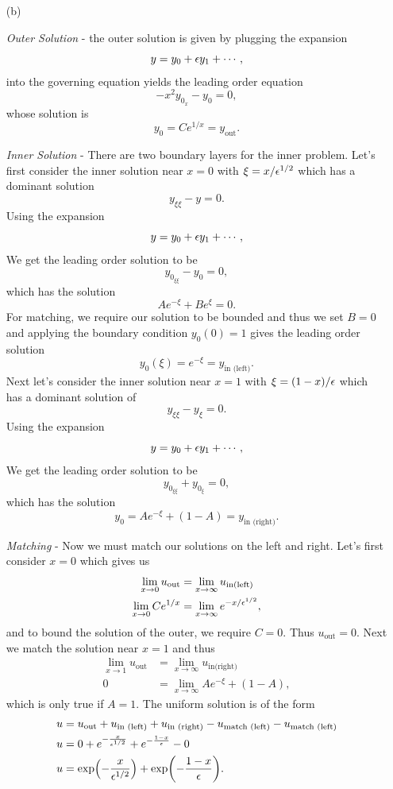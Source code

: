 \documentclass[12pt]{report}
\begin{document}
\begin{solution}
\begin{enumerate}
    \item [(b)]
    
    \noindent
    {\it Outer Solution} - the outer solution is given by plugging the expansion
    \[ 
        y = y_0 + {\epsilon} y_1 + \cdots,
    \]
    into the governing equation yields the leading order equation
    \[ 
        -x^2y_{0_x} - y_0 = 0,
    \]    
    whose solution is
    \[ 
        y_0 = C e^{1/x} = y_{\text{out}}.
    \]


    \noindent
    {\it Inner Solution} - There are two boundary layers for the inner problem. Let's first consider the inner solution near $x = 0$ with $\xi = x/{\epsilon}^{1/2}$ which has a dominant solution 
    \[ 
        y_{\xi \xi} - y = 0.
    \] 
    Using the expansion
    \[ 
        y = y_0 + {\epsilon} y_1 + \cdots,
    \]
    We get the leading order solution to be
    \[ 
        y_{0_{\xi\xi}} - y_0 = 0,
    \]
    which has the solution
    \[ 
        Ae^{-\xi} + Be^{\xi} = 0.
    \]
    For matching, we require our solution to be bounded and thus we set $B = 0$ and applying the boundary condition $y_0(0) = 1$ gives the leading order solution
    \[ 
        y_0(\xi) = e^{-\xi} = y_{\text{in (left)}}.
    \]
    Next let's consider the inner solution near $x=1$ with $\xi = (1-x)/{\epsilon}$ which has a dominant solution of
    \[ 
        y_{\xi \xi} - y_{\xi} = 0.
    \]
    Using the expansion
    \[ 
        y = y_0 + {\epsilon} y_1 + \cdots,
    \]
    We get the leading order solution to be
    \[ 
        y_{0_{\xi\xi}} + y_{0_\xi} = 0,
    \]
    which has the solution
    \[ 
        y_0 = Ae^{-\xi} + (1-A) = y_{\text{in (right)}}.
    \]

    \noindent
    {\it Matching} - Now we must match our solutions on the left and right. Let's first consider $x = 0$ which gives us
    \begin{align*}
        \lim_{x \to 0} u_{\text{out}} &= \lim_{x \to \infty} u_{\text{in(left)}}\\
        \lim_{x \to 0} C e^{1/x} &= \lim_{x \to \infty} e^{- x/{\epsilon}^{1/2}},
    \end{align*}
    and to bound the solution of the outer, we require $C=0$. Thus $u_{\text{out}} = 0$. Next we match the solution near $x = 1$ and thus
    \begin{align*}
        \lim_{x \to 1} u_{\text{out}} &= \lim_{x \to \infty} u_{\text{in(right)}}\\
        0 &=  \lim_{x \to \infty} Ae^{-\xi} + (1-A),
    \end{align*}
    which is only true if $A=1$. The uniform solution is of the form
    \begin{align*}
        u &= u_{\text{out}} + u_{\text{in (left)}} + u_{\text{in (right)}} - u_{\text{match (left)}} - u_{\text{match (left)}}\\
        u &= 0 + e^{-\frac{x}{{\epsilon}^{1/2}}} + e^{-\frac{1-x}{{\epsilon}}} - 0\\
        u &= \text{exp}{\left(-\frac{x}{{\epsilon}^{1/2}}\right)} + \text{exp}{\left(-\frac{1-x}{{\epsilon}}\right)}.
    \end{align*}
    

\end{enumerate}
\end{solution}
\end{document}

